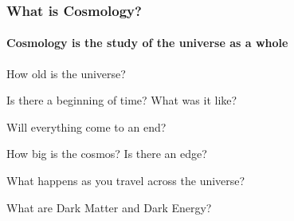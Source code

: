 \begin{frame}[label=what_is_cosmology]
	\frametitle{What is Cosmology?}
	\framesubtitle{Cosmology is the study of the universe as a whole}
	\begin{description}
		\item<2->[Age:]{How old is the universe?}
		\item<3->[Birth:]{Is there a beginning of time? What was it like?}
		\item<4->[Fate:]{Will everything come to an end?}
		\item<5->[Size:]{How big is the cosmos? Is there an edge?}
		\item<6->[Shape:]{What happens as you travel across the universe?}
		\item<7->[Content:]{What are Dark Matter and Dark Energy?}
	\end{description}
\end{frame}

